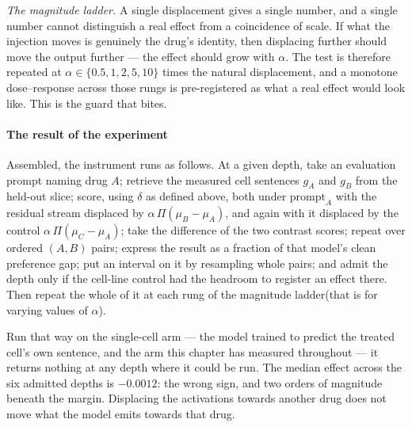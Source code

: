 \emph{The magnitude ladder.} A single displacement gives a single number, and a
single number cannot distinguish a real effect from a coincidence of scale. If
what the injection moves is genuinely the drug's identity, then displacing
further should move the output further --- the effect should grow with $\alpha$.
The test is therefore repeated at $\alpha \in \{0.5, 1, 2, 5, 10\}$ times the
natural displacement, and a monotone dose--response across those rungs is
pre-registered as what a real effect would look like. This is the guard that
bites.

\paragraph{The result of the experiment}
Assembled, the instrument runs as follows. At a given depth, take an evaluation prompt
naming drug $A$; retrieve the measured cell sentences $g_A$ and $g_B$ from the
held-out slice; score, using $\delta$ as defined above, both under $\textrm{prompt}_A$ with the residual stream
displaced by $\alpha\,\Pi(\mu_B - \mu_A)$, and again with it displaced by the
control $\alpha\,\Pi(\mu_C - \mu_A)$; take the difference of the two contrast
scores; repeat over ordered $(A,B)$ pairs; express the result as a fraction of
that model's clean preference gap; put an interval on it by resampling whole
pairs; and admit the depth only if the cell-line control had the headroom to
register an effect there. Then repeat the whole of it at each rung of the
magnitude ladder(that is for varying values of $\alpha$).

Run that way on the single-cell arm --- the model trained to predict the treated
cell's own sentence, and the arm this chapter has measured throughout --- it
returns nothing at any depth where it could be run. The median effect across the
six admitted depths is $-0.0012$: the wrong sign, and two orders of magnitude
beneath the margin. Displacing the activations towards another drug does not
move what the model emits towards that drug.

